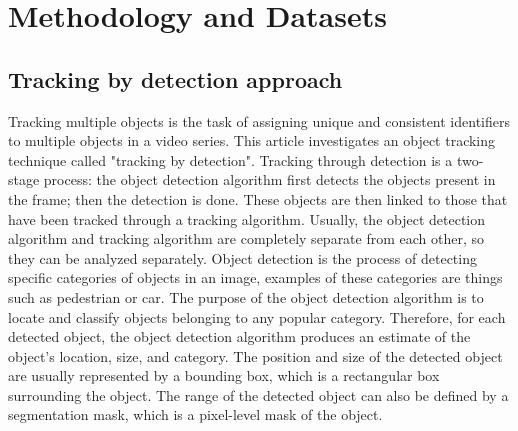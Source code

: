 \chapter{Methodology and Datasets}\label{chap:method}
\section{Tracking by detection approach}
Tracking multiple objects is the task of assigning unique and consistent identifiers to multiple objects in a video series. This article investigates an object tracking technique called "tracking by detection". Tracking through detection is a two-stage process: the object detection algorithm first detects the objects present in the frame; then the detection is done. These objects are then linked to those that have been tracked through a tracking algorithm. Usually, the object detection algorithm and tracking algorithm are completely separate from each other, so they can be analyzed separately.
Object detection is the process of detecting specific categories of objects in an image, examples of these categories are things such as pedestrian or car. The purpose of the object detection algorithm is to locate and classify objects belonging to any popular category. Therefore, for each detected object, the object detection algorithm produces an estimate of the object's location, size, and category. The position and size of the detected object are usually represented by a bounding box, which is a rectangular box surrounding the object. The range of the detected object can also be defined by a segmentation mask, which is a pixel-level mask of the object.
